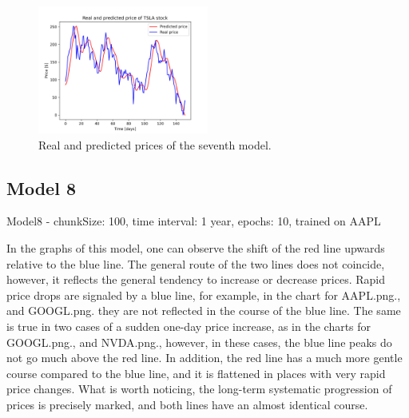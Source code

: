 \begin{figure}
\includegraphics[width=0.5\textwidth]{./graf/model7/TSLA.png}
\caption{Real and predicted prices of the seventh model.}
\label{fig:label}
\end{figure} 

\clearpage
\subsection{Model 8}

Model8 - chunkSize: 100, time interval: 1 year, epochs: 10, trained on AAPL\par\bigskip
In the graphs of this model, one can observe the shift of the red line upwards relative to the blue line.
The general route of the two lines does not coincide, however, it reflects the general tendency to
increase or decrease prices. Rapid price drops are signaled by a blue line, for example, in the chart for AAPL.png.,
and GOOGL.png. they are not reflected in the course of the blue line. The same is true in two cases of
a sudden one-day price increase, as in the charts for GOOGL.png., and NVDA.png.,
however, in these cases, the blue line peaks do not go much above the red line. In addition, the red
line has a much more gentle course compared to the blue line, and it is flattened in places with very rapid price changes. What is worth noticing, the long-term systematic progression of
prices is precisely marked, and both lines have an almost identical course.

